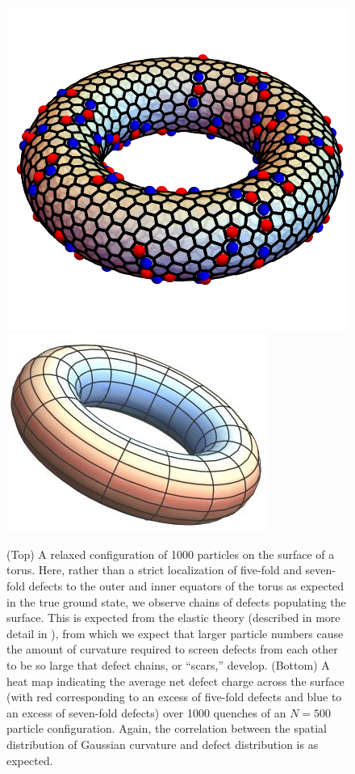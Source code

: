 \documentclass[preprint,12pt]{elsarticle}
\begin{document}
\begin{figure}[b!]
\centering
\includegraphics[width=0.75\columnwidth]{1000_particle_voronoi_points.pdf}
\includegraphics[width=0.75\columnwidth]{torusDefectHeatmap.JPG}
\caption{ (Top) A relaxed configuration of 1000 particles on the surface of a torus. Here, rather than a strict localization of five-fold and seven-fold defects to the outer and inner equators of the torus as expected in the true ground state, we observe chains of defects populating the surface. This is expected from the elastic theory (described in more detail in \cite{giomi2008elastic}), from which we expect that larger particle numbers cause the amount of curvature required to screen defects from each other to be so large that defect chains, or ``scars,'' develop. (Bottom) A heat map indicating the average net defect charge across the surface (with red corresponding to an excess of five-fold defects and blue to an excess of seven-fold defects) over 1000 quenches of an $N=500$ particle configuration. Again, the correlation between the spatial distribution of Gaussian curvature and defect distribution is as expected.}
\label{fig:smallTorusLargeN}
\end{figure}
\end{document}
